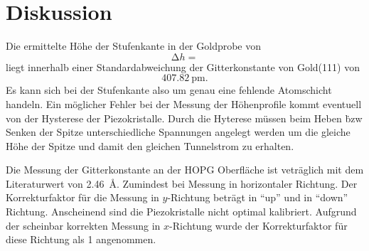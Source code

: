 \section{Diskussion}\label{sec:Diskussion}

Die ermittelte Höhe der Stufenkante in der Goldprobe von
\begin{equation*}
  \increment h = 
\end{equation*}
liegt innerhalb einer Standardabweichung der Gitterkonstante von Gold(111) von
\begin{equation}
  \SI{407.82}{\pico\meter}.
\end{equation}
Es kann sich bei der Stufenkante also um genau eine fehlende Atomschicht handeln. Ein möglicher Fehler bei der Messung der Höhenprofile
kommt eventuell von der Hysterese der Piezokristalle. Durch die Hyterese müssen beim Heben \.bzw Senken der Spitze unterschiedliche Spannungen angelegt werden
um die gleiche Höhe der Spitze und damit den gleichen Tunnelstrom zu erhalten.


Die Messung der Gitterkonstante an der HOPG Oberfläche ist veträglich mit dem Literaturwert von \SI{2.46}{\angstrom}. Zumindest bei Messung in horizontaler Richtung.
Der Korrekturfaktor für die Messung in $y$-Richtung beträgt  in \enquote{up} und  in
\enquote{down} Richtung. Anscheinend sind die Piezokristalle nicht optimal kalibriert. Aufgrund der scheinbar korrekten Messung in $x$-Richtung wurde der Korrekturfaktor
für diese Richtung als \num{1} angenommen.
